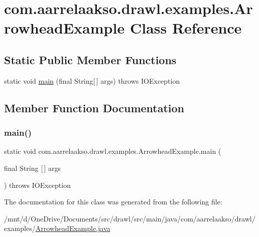\hypertarget{classcom_1_1aarrelaakso_1_1drawl_1_1examples_1_1_arrowhead_example}{}\section{com.\+aarrelaakso.\+drawl.\+examples.\+Arrowhead\+Example Class Reference}
\label{classcom_1_1aarrelaakso_1_1drawl_1_1examples_1_1_arrowhead_example}
\subsection*{Static Public Member Functions}
\begin{DoxyCompactItemize}
\item 
static void \hyperlink{classcom_1_1aarrelaakso_1_1drawl_1_1examples_1_1_arrowhead_example_ad77c13fdb08b2be4a9517048463ba379}{main} (final String\mbox{[}$\,$\mbox{]} args)  throws I\+O\+Exception 
\end{DoxyCompactItemize}


\subsection{Member Function Documentation}
\mbox{\label{classcom_1_1aarrelaakso_1_1drawl_1_1examples_1_1_arrowhead_example_ad77c13fdb08b2be4a9517048463ba379}} 
\subsubsection{\texorpdfstring{main()}{main()}}
{\footnotesize\ttfamily static void com.\+aarrelaakso.\+drawl.\+examples.\+Arrowhead\+Example.\+main (\begin{DoxyParamCaption}\item[{final String \mbox{[}$\,$\mbox{]}}]{args }\end{DoxyParamCaption}) throws I\+O\+Exception\hspace{0.3cm}{\ttfamily [static]}}



The documentation for this class was generated from the following file\+:\begin{DoxyCompactItemize}
\item 
/mnt/d/\+One\+Drive/\+Documents/src/drawl/src/main/java/com/aarrelaakso/drawl/examples/\hyperlink{_arrowhead_example_8java}{Arrowhead\+Example.\+java}\end{DoxyCompactItemize}
